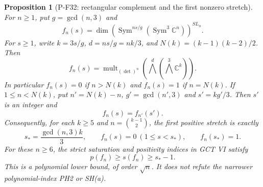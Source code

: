 \documentclass[11pt,a4paper]{article}
\newtheorem{proposition}{Proposition}[section]
\begin{document}
\begin{proposition}[P-F32: rectangular complement and the first nonzero stretch]
\label{prop:cubicexteriorduality}
For $n\ge1$, put $g=\gcd(n,3)$ and
\[
 f_n(s)=\dim\left(\operatorname{Sym}^{ns/g}
                         (\operatorname{Sym}^3\mathbb C^n)\right)^{SL_n}.
\]
For $s\ge1$, write $k=3s/g$, $d=ns/g=nk/3$, and
$N(k)=(k-1)(k-2)/2$. Then
\[
 f_n(s)=\operatorname{mult}_{(\det)^n}
       \left(\bigwedge^d\left(\bigwedge^3\mathbb C^k\right)\right).
 \tag{P-F32a}
\]
In particular $f_n(s)=0$ if $n>N(k)$ and $f_n(s)=1$ if $n=N(k)$.
If $1\le n<N(k)$, put $n'=N(k)-n$, $g'=\gcd(n',3)$
and $s'=kg'/3$. Then $s'$ is an integer and
\[
                         f_n(s)=f_{n'}(s').
 \tag{P-F32b}
\]
Consequently, for each $k\ge5$ and $n=\binom{k-1}{2}$,
the first positive stretch is exactly
\[
 s_* = \frac{\gcd(n,3)k}{3},\qquad
 f_n(s)=0\ (1\le s<s_*),\qquad f_n(s_*)=1.
 \tag{P-F32c}
\]
For these $n\ge6$, the strict saturation and positivity
indices in GCT VI satisfy
\[
                     p(f_n)\ge s(f_n)\ge s_*-1.
 \tag{P-F32d}
\]
This is a polynomial lower bound, of order $\sqrt n$.
It does not refute the narrower polynomial-index PH2 or SH(a).
\end{proposition}
\end{document}
